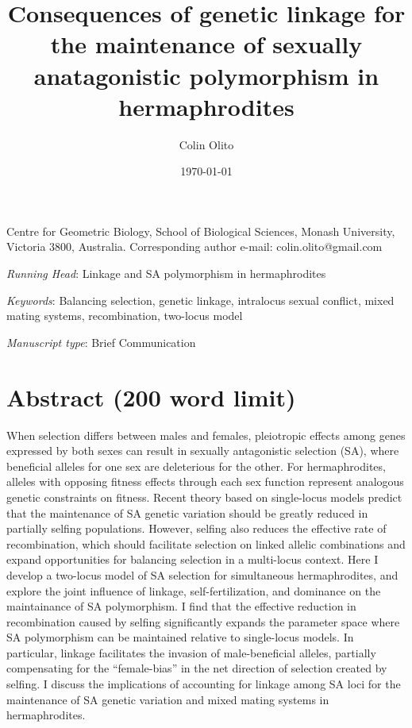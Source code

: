 \documentclass{article}
\title{Consequences of genetic linkage for the maintenance of sexually anatagonistic polymorphism in hermaphrodites}
\author{Colin Olito}
\date{\today}
\begin{document}
\maketitle


\noindent{} Centre for Geometric Biology, School of Biological Sciences, Monash University, Victoria 3800, Australia.
\noindent{} Corresponding author e-mail: colin.olito@gmail.com

\bigskip

\noindent{} \textit{Running Head}: Linkage and SA polymorphism in hermaphrodites

\bigskip

\noindent{} \textit{Keywords}: Balancing selection, genetic linkage, intralocus sexual conflict, mixed mating systems, recombination, two-locus model

\bigskip

\noindent{} \textit{Manuscript type}: Brief Communication

\bigskip


\linenumbers
\modulolinenumbers[1]
\renewcommand\linenumberfont{\normalfont\small}


\newpage{}
\section*{Abstract (200 word limit)}

\noindent{} When selection differs between males and females, pleiotropic effects among genes expressed by both sexes can result in sexually antagonistic selection (SA), where beneficial alleles for one sex are deleterious for the other. For hermaphrodites, alleles with opposing fitness effects through each sex function represent analogous genetic constraints on fitness. Recent theory based on single-locus models predict that the maintenance of SA genetic variation should be greatly reduced in partially selfing populations. However, selfing also reduces the effective rate of recombination, which should facilitate selection on linked allelic combinations and expand opportunities for balancing selection in a multi-locus context. Here I develop a two-locus model of SA selection for simultaneous hermaphrodites, and explore the joint influence of linkage, self-fertilization, and dominance on the maintainance of SA polymorphism. I find that the effective reduction in recombination caused by selfing significantly expands the parameter space where SA polymorphism can be maintained relative to single-locus models. In particular, linkage facilitates the invasion of male-beneficial alleles, partially compensating for the ``female-bias'' in the net direction of selection created by selfing. I discuss the implications of accounting for linkage among SA loci for the maintenance of SA genetic variation and mixed mating systems in hermaphrodites.
\end{document}
